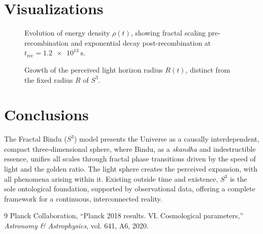 \documentclass[11pt]{article}
\begin{document}
\section{Visualizations}
\begin{figure}[h]
\centering
{}
\caption{Evolution of energy density $\rho(t)$, showing fractal scaling pre-recombination and exponential decay post-recombination at $t_{\text{rec}} = \SI{1.2e13}{\second}$.}
\label{fig:energy_density}
\end{figure}

\begin{figure}[h]
\centering
{}
\caption{Growth of the perceived light horizon radius $R(t)$, distinct from the fixed radius $R$ of $S^3$.}
\label{fig:horizon_growth}
\end{figure}

\section{Conclusions}
The Fractal Bindu ($S^3$) model presents the Universe as a causally interdependent, compact three-dimensional sphere, where Bindu, as a \textit{skandha} and indestructible essence, unifies all scales through fractal phase transitions driven by the speed of light and the golden ratio. The light sphere creates the perceived expansion, with all phenomena arising within it. Existing outside time and existence, $S^3$ is the sole ontological foundation, supported by observational data, offering a complete framework for a continuous, interconnected reality.

\begin{thebibliography}{9}
Planck Collaboration, ``Planck 2018 results. VI. Cosmological parameters,'' \textit{Astronomy \& Astrophysics}, vol. 641, A6, 2020.
\end{thebibliography}
\end{document}
